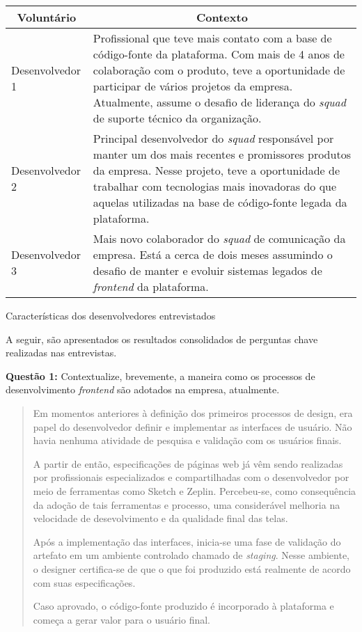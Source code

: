 \begin{quadro}
\centering
\begin{tabular}{|m{4cm}|m{10cm}|} \hline
	
	\multicolumn{1}{|c|}{\bfseries Voluntário} & \multicolumn{1}{c|}{\bfseries Contexto} \\\hline
	
	 Desenvolvedor 1 & Profissional que teve mais contato com a base de código-fonte da plataforma. Com mais de 4 anos de colaboração com o produto, teve a oportunidade de participar de vários projetos da empresa. Atualmente, assume o desafio de liderança do \textit{squad} de suporte técnico da organização. \\\hline
	 
	 Desenvolvedor 2 & Principal desenvolvedor do \textit{squad} responsável por manter um dos mais recentes e promissores produtos da empresa. Nesse projeto, teve a oportunidade de trabalhar com tecnologias mais inovadoras do que aquelas utilizadas na base de código-fonte legada da plataforma. \\\hline
	 
	 Desenvolvedor 3 & Mais novo colaborador do \textit{squad} de comunicação da empresa. Está a cerca de dois meses assumindo o desafio de manter e evoluir sistemas legados de \textit{frontend} da plataforma. \\\hline
    
\end{tabular}
\caption{Características dos desenvolvedores entrevistados}
\label{table:devsResearch}
\end{quadro}

A seguir, são apresentados os resultados consolidados de perguntas chave realizadas nas entrevistas.

\textbf{Questão 1:} Contextualize, brevemente, a maneira como os processos de desenvolvimento \textit{frontend} são adotados na empresa, atualmente.

\begin{quote}
    Em momentos anteriores à definição dos primeiros processos de design, era papel do desenvolvedor definir e implementar as interfaces de usuário. Não havia nenhuma atividade de pesquisa e validação com os usuários finais.
    
    A partir de então, especificações de páginas web já vêm sendo realizadas por profissionais especializados e compartilhadas com o desenvolvedor por meio de ferramentas como Sketch e Zeplin. Percebeu-se, como consequência da adoção de tais ferramentas e processo, uma considerável melhoria na velocidade de desevolvimento e da qualidade final das telas.
    
    Após a implementação das interfaces, inicia-se uma fase de validação do artefato em um ambiente controlado chamado de \textit{staging}. Nesse ambiente, o designer certifica-se de que o que foi produzido está realmente de acordo com suas especificações.
    
    Caso aprovado, o código-fonte produzido é incorporado à plataforma e começa a gerar valor para o usuário final.
\end{quote}

